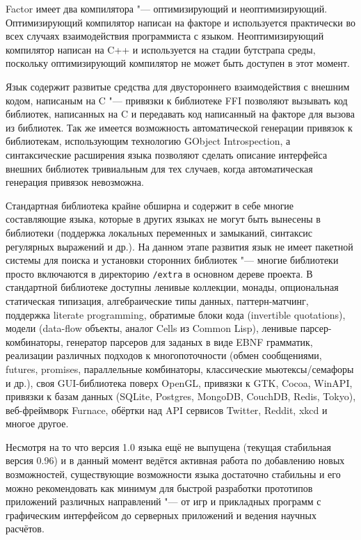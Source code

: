\documentclass[a5paper,10pt,russian]{article}
\begin{document}
Factor имеет два компилятора "--- оптимизирующий и
неоптимизирующий. Оптимизирующий компилятор написан на факторе и
используется практически во всех случаях взаимодействия программиста с
языком. Неоптимизирующий компилятор написан на C++ и используется на
стадии бутстрапа среды, поскольку оптимизирующий компилятор не может
быть доступен в этот момент.

Язык содержит развитые средства для двустороннего взаимодействия с
внешним кодом, написаным на C "--- привязки к библиотеке FFI позволяют
вызывать код библиотек, написанных на C и передавать код написанный на
факторе для вызова из библиотек. Так же имеется возможность
автоматической генерации привязок к библиотекам, использующим
технологию GObject Introspection, а синтаксические расширения языка
позволяют сделать описание интерфейса внешних библиотек тривиальным
для тех случаев, когда автоматическая генерация привязок невозможна.

Стандартная библиотека крайне обширна и содержит в себе многие
составляющие языка, которые в других языках не могут быть вынесены в
библиотеки (поддержка локальных переменных и замыканий, синтаксис
регулярных выражений и др.). На данном этапе развития язык не имеет
пакетной системы для поиска и установки сторонних библиотек "---
многие библиотеки просто включаются в директорию {\tt/extra} в
основном дереве проекта. В стандартной библиотеке доступны ленивые
коллекции, монады, опциональная статическая типизация, алгебраические
типы данных, паттерн-матчинг, поддержка literate programming,
обратимые блоки кода (invertible quotations), модели (data-flow
объекты, аналог Cells из Common Lisp), ленивые парсер-комбинаторы,
генератор парсеров для заданых в виде EBNF грамматик, реализации
различных подходов к многопоточности (обмен сообщениями, futures,
promises, параллельные комбинаторы, классические мьютексы/семафоры и
др.), своя GUI-библиотека поверх OpenGL, привязки к GTK, Cocoa,
WinAPI, привязки к базам данных (SQLite, Postgres, MongoDB, CouchDB,
Redis, Tokyo), веб-фреймворк Furnace, обёртки над API сервисов
Twitter, Reddit, xkcd и многое другое.

Несмотря на то что версия 1.0 языка ещё не выпущена (текущая
стабильная версия 0.96) и в данный момент ведётся активная работа по
добавлению новых возможностей, существующие возможности языка
достаточно стабильны и его можно рекомендовать как минимум для быстрой
разработки прототипов приложений различных направлений "--- от игр и
прикладных программ с графическим интерфейсом до серверных приложений
и ведения научных расчётов.

\nocite{pestov2010}
\nocite{HerzbergR09}

\end{document}

